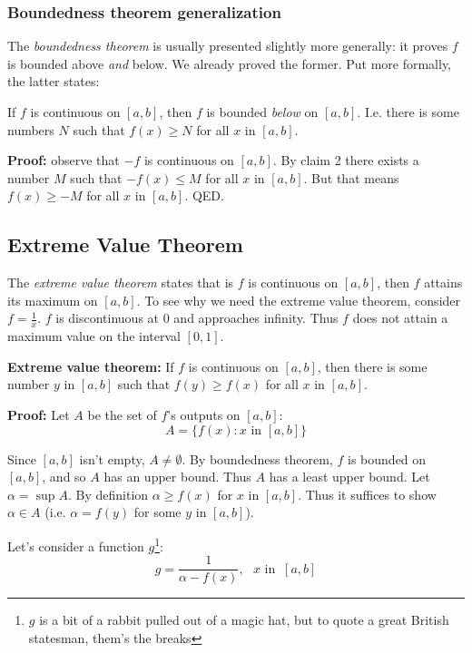 \subsubsection*{Boundedness theorem generalization}
The \textit{boundedness theorem} is usually presented slightly more
generally: it proves $f$ is bounded above \textit{and} below. We
already proved the former. Put more formally, the latter states:

\vs

If $f$ is continuous on $[a,b]$, then $f$ is bounded \textit{below} on
$[a,b]$. I.e. there is some numbers $N$ such that $f(x)\geq N$ for all
$x$ in $[a,b]$.

\vs

\textbf{Proof:} observe that $-f$ is continuous on $[a,b]$. By claim 2
there exists a number $M$ such that $-f(x)\leq M$ for all $x$ in
$[a,b]$. But that means $f(x)\geq -M$ for all $x$ in $[a,b]$. QED.


\subsection{Extreme Value Theorem}

The \textit{extreme value theorem} states that is $f$ is continuous on
$[a,b]$, then $f$ attains its maximum on $[a,b]$. To see why we need
the extreme value theorem, consider $f=\frac{1}{x}$. $f$ is
discontinuous at $0$ and approaches infinity. Thus $f$ does not attain
a maximum value on the interval $[0,1]$.

\vs

\textbf{Extreme value theorem:} If $f$ is continuous on $[a,b]$, then
there is some number $y$ in $[a,b]$ such that $f(y)\geq f(x)$ for all
$x$ in $[a,b]$.

\vs

\textbf{Proof:} Let $A$ be the set of $f$'s outputs on $[a,b]$:
\[A=\{f(x):x\text{ in }[a,b]\}\]

Since $[a,b]$ isn't empty, $A\neq\emptyset$. By boundedness theorem,
$f$ is bounded on $[a,b]$, and so $A$ has an upper bound. Thus $A$ has
a least upper bound. Let $\alpha=\sup A$. By definition
$\alpha\geq f(x)$ for $x$ in $[a,b]$. Thus it suffices to show
$\alpha\in A$ (i.e. $\alpha=f(y)$ for some $y$ in $[a,b]$).

\vs

Let's consider a function $g$\footnote{$g$ is a bit of a rabbit pulled
  out of a magic hat, but to quote a great British statesman, them's
  the breaks}:
\[g=\frac{1}{\alpha-f(x)},\ \ \ x \text{ in }\ [a,b]\]

